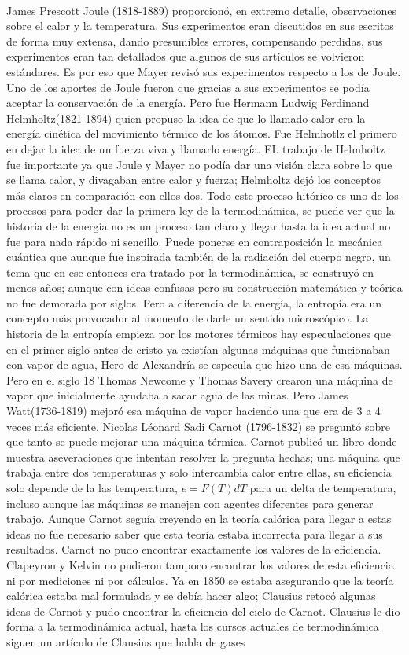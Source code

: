 \\
James Prescott Joule (1818-1889) proporcionó, en extremo detalle, observaciones sobre el calor y la temperatura. Sus experimentos eran discutidos en sus escritos de forma muy extensa, dando presumibles errores, compensando perdidas, sus experimentos eran tan detallados que algunos de sus artículos se volvieron estándares. Es por eso que Mayer revisó sus experimentos respecto a los de Joule. Uno de los aportes de Joule fueron que gracias a sus experimentos se podía aceptar la conservación de la energía. Pero fue Hermann Ludwig Ferdinand Helmholtz(1821-1894) quien propuso la idea de que lo llamado calor era la energía cinética del movimiento térmico de los átomos. Fue Helmhotlz el primero en dejar la idea de un fuerza viva y llamarlo energía. EL trabajo de Helmholtz fue importante ya que Joule y  Mayer no podía dar una visión clara sobre lo que se llama calor, y divagaban entre calor y fuerza; Helmholtz dejó los conceptos más claros en comparación con ellos dos.  Todo este proceso hitórico es uno de los procesos para poder dar la primera ley de la termodinámica, se puede ver que la historia de la energía no es un proceso tan claro y llegar hasta la idea actual no fue para nada rápido ni sencillo. Puede ponerse en contraposición la mecánica cuántica que aunque fue inspirada también de la radiación del cuerpo negro, un tema que en ese entonces era tratado por la termodinámica, se construyó en menos años; aunque con ideas confusas pero su construcción matemática y teórica no fue demorada por siglos. Pero a diferencia de la energía, la entropía era un concepto más provocador al momento de darle un sentido microscópico. La historia de la  entropía empieza por los motores térmicos hay especulaciones que en el primer siglo antes de cristo ya existían algunas máquinas que funcionaban con vapor de agua, Hero de Alexandría se especula que hizo una de esa máquinas. Pero en el siglo 18 Thomas Newcome y Thomas Savery crearon una máquina de vapor que inicialmente ayudaba a sacar agua de las minas. Pero James Watt(1736-1819) mejoró esa máquina de vapor haciendo una que era de 3 a 4 veces más eficiente. Nicolas Léonard Sadi Carnot (1796-1832) se preguntó sobre que tanto se puede mejorar una máquina térmica. Carnot publicó un libro donde muestra aseveraciones que intentan resolver la pregunta hechas; una máquina que trabaja entre dos temperaturas y solo intercambia calor entre ellas, su eficiencia solo depende de la  las temperatura, $e=F(T)dT$ para un delta de temperatura, incluso aunque las máquinas se manejen con agentes diferentes para generar trabajo. Aunque Carnot seguía creyendo en la teoría calórica para llegar a estas ideas no fue necesario saber que esta teoría estaba incorrecta para llegar a sus resultados. Carnot no pudo encontrar exactamente los valores de la eficiencia. Clapeyron y Kelvin no pudieron tampoco encontrar los valores de esta eficiencia ni por mediciones ni por cálculos. Ya en 1850 se estaba asegurando que la teoría calórica estaba mal formulada y se debía hacer algo; Clausius retocó algunas ideas de Carnot y pudo encontrar la eficiencia del ciclo de Carnot. Clausius le dio forma a la termodinámica actual, hasta los cursos actuales de termodinámica siguen un artículo de Clausius que habla de gases 